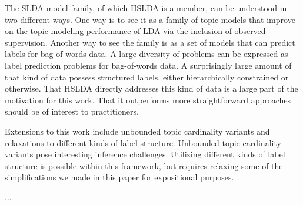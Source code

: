 
The SLDA model family, of which HSLDA is a member, can be understood in two different ways.  One way is to see it as a family of topic models that improve on the topic modeling performance of LDA via the inclusion of observed supervision.  Another way to see the family is as a set of models that can predict labels for bag-of-words data.  A large diversity of problems can be expressed as label prediction problems for bag-of-words data.  A surprisingly large amount of that kind of data possess structured labels, either hierarchically constrained or otherwise.  That HSLDA directly addresses this kind of data is a large part of the motivation for this work.   That it outperforms more straightforward approaches should be of interest to practitioners.

Extensions to this work include unbounded topic cardinality variants and relaxations to different kinds of label structure.  Unbounded topic cardinality variants pose interesting inference challenges.  Utilizing different kinds of label structure is possible within this framework, but requires relaxing some of the simplifications we made in this paper for expositional purposes. 


...

